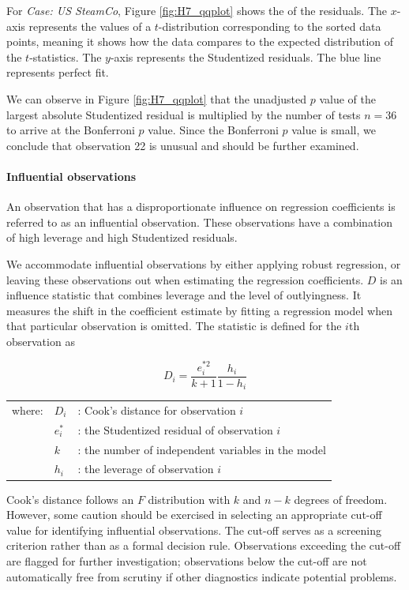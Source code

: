 \bigskip
For \emph{Case: US SteamCo}, Figure \ref{fig:H7_qqplot} shows the  of the residuals. 
The $x$-axis represents the values of a $t$-distribution corresponding to the sorted data points, meaning it shows how the data compares to the expected distribution of the $t$-statistics.
The $y$-axis represents the Studentized residuals. The blue line represents perfect fit. 

We can observe in Figure \ref{fig:H7_qqplot} that the unadjusted $p$ value of the largest absolute Studentized residual is multiplied by the number of tests $n = 36$ to arrive at the Bonferroni $p$ value. Since the Bonferroni $p$ value is small, we conclude that observation 22 is unusual and should be further examined.

\paragraph{Influential observations} An observation that has a disproportionate influence on regression coefficients is referred to as an influential observation. These observations have a combination of high leverage and high Studentized residuals.

We accommodate influential observations by either applying robust regression, or leaving these observations out when estimating the regression coefficients.  $D$ is an influence statistic that combines leverage and the level of outlyingness. It measures the shift in the coefficient estimate by fitting a regression model when that particular observation is omitted. The statistic is defined for the $i$th observation as

\begin{equation}
D_i = \frac{e_i^{*2}}{k+1}\frac{h_i}{1-h_i}
\end{equation}
\begin{tabularx}{\textwidth}{@{}llX@{}}
where: &$D_i$ & : Cook's distance for observation $i$\\
&$e_i^*$ & : the Studentized residual of observation $i$\\
& $k$ & : the number of independent variables in the model\\
& $h_i$ & : the leverage of observation $i$\\
\end{tabularx}

\bigskip
Cook's distance follows an $F$ distribution with $k$ and $n - k$ degrees of freedom. However, some caution should be exercised in selecting an appropriate cut-off value for identifying influential observations. 
The cut-off serves as a screening criterion rather than as a formal decision rule. 
Observations exceeding the cut-off are flagged for further investigation; observations below the cut-off are not automatically free from scrutiny if other diagnostics indicate potential problems.

